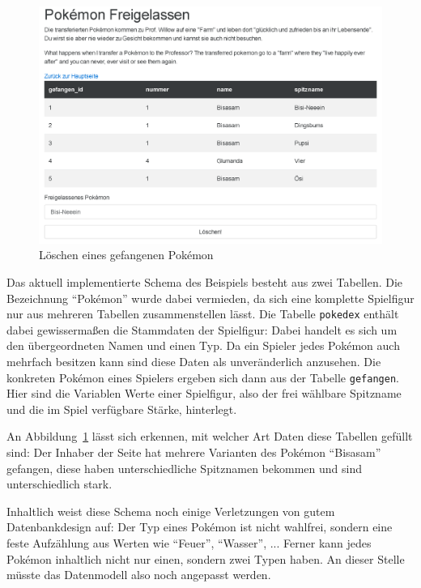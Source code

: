 \begin{figure}[h]
  \centering \includegraphics[width=\textwidth-2pt,frame]{images/screenshots/20161019/enduser-pokemongo-free.png}
  \caption{Löschen eines gefangenen Pokémon}
  \label{fig:enduser-pokemongo-delete}
\end{figure}

Das aktuell implementierte Schema des Beispiels besteht aus zwei Tabellen. Die Bezeichnung "`Pokémon"' wurde dabei vermieden, da sich eine komplette Spielfigur nur aus mehreren Tabellen zusammenstellen lässt. Die Tabelle \texttt{pokedex} enthält dabei gewissermaßen die Stammdaten der Spielfigur: Dabei handelt es sich um den übergeordneten Namen und einen Typ. Da ein Spieler jedes Pokémon auch mehrfach besitzen kann sind diese Daten als unveränderlich anzusehen. Die konkreten Pokémon eines Spielers ergeben sich dann aus der Tabelle \texttt{gefangen}. Hier sind die Variablen Werte einer Spielfigur, also der frei wählbare Spitzname und die im Spiel verfügbare Stärke, hinterlegt.

An Abbildung~\ref{fig:enduser-pokemongo-delete} lässt sich erkennen, mit welcher Art Daten diese Tabellen gefüllt sind: Der Inhaber der Seite hat mehrere Varianten des Pokémon "`Bisasam"' gefangen, diese haben unterschiedliche Spitznamen bekommen und sind unterschiedlich stark.

Inhaltlich weist diese Schema noch einige Verletzungen von gutem Datenbankdesign auf: Der Typ eines Pokémon ist nicht wahlfrei, sondern eine feste Aufzählung aus Werten wie "`Feuer"', "`Wasser"', ... Ferner kann jedes Pokémon inhaltlich nicht nur einen, sondern zwei Typen haben. An dieser Stelle müsste das Datenmodell also noch angepasst werden.

